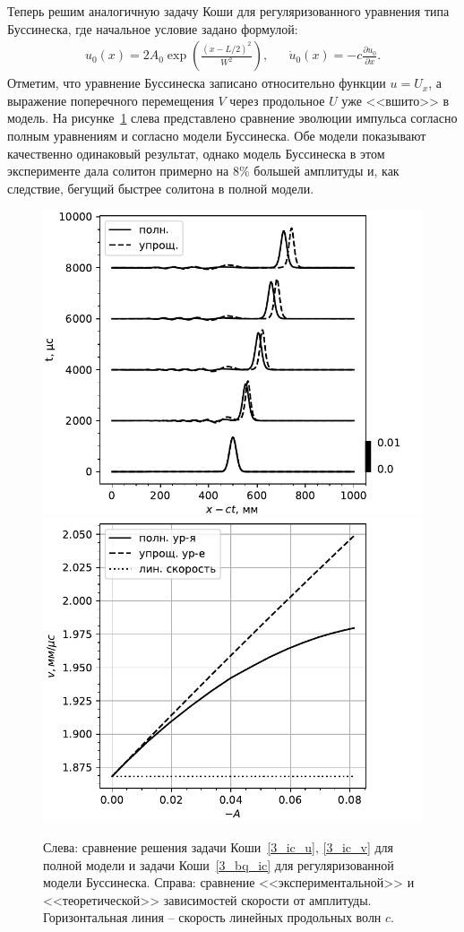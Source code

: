 \documentclass[12pt, a4paper]{report}
\newcommand{\lb}{\left (}
\newcommand{\rb}{\right )}
\newcommand{\pdiff}[2]{\frac{\partial #1}{\partial #2}}
\begin{document}
Теперь решим аналогичную задачу Коши для регуляризованного уравнения типа Буссинеска, где начальное условие задано формулой:
\begin{align}
\label{3_bq_ic}
& u_0 (x) = 2A_0 \exp\lb \frac{(x - L/2)^2}{W^2}\rb,&  &\dot{u}_0 (x) = -c \pdiff{u_0}{x}.&
\end{align}
Отметим, что уравнение Буссинеска записано относительно функции $u = U_{x}$, а выражение поперечного перемещения $V$ через продольное $U$ уже <<вшито>> в модель.
На рисунке~\ref{fig:evol_compar2} слева представлено сравнение эволюции импульса согласно полным уравнениям и согласно модели Буссинеска.
Обе модели показывают качественно одинаковый результат, однако модель Буссинеска в этом эксперименте дала солитон примерно на 8\% большей амплитуды и, как следствие, бегущий быстрее солитона в полной модели.
\begin{figure}[h]
	\centering
	\includegraphics[width=0.49\linewidth]{figures/SolEvolCompare}
	\includegraphics[width=0.49\linewidth]{figures/VelAmpl}
	\caption{Слева: сравнение решения задачи Коши~\eqref{3_ic_u}, \eqref{3_ic_v} для полной модели и задачи Коши~\eqref{3_bq_ic} для регуляризованной модели Буссинеска. Справа: сравнение <<экспериментальной>> и <<теоретической>> зависимостей скорости от амплитуды. Горизонтальная линия -- скорость линейных продольных волн $c$.}
	\label{fig:evol_compar2}
\end{figure}
\end{document}
